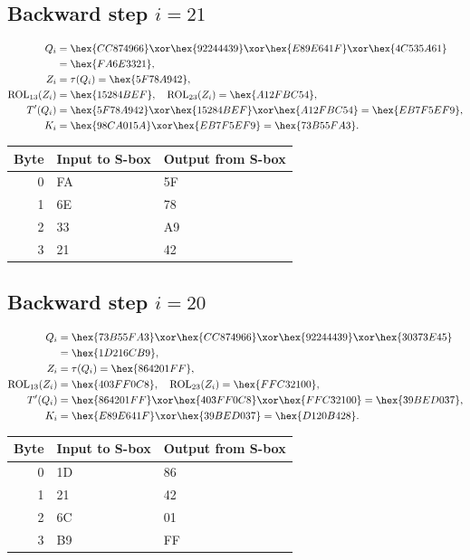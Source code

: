 \subsection*{Backward step $i=21$}
\begin{align*}
Q_i&=\hex{CC874966}\xor\hex{92244439}\xor\hex{E89E641F}\xor\hex{4C535A61}\\&=\hex{FA6E3321},\\
Z_i&=\tau(Q_i)=\hex{5F78A942},\\
\operatorname{ROL}_{13}(Z_i)&=\hex{15284BEF},\quad\operatorname{ROL}_{23}(Z_i)=\hex{A12FBC54},\\
T'(Q_i)&=\hex{5F78A942}\xor\hex{15284BEF}\xor\hex{A12FBC54}=\hex{EB7F5EF9},\\
K_i&=\hex{98CA015A}\xor\hex{EB7F5EF9}=\hex{73B55FA3}.\end{align*}
\begingroup\small
\begin{longtable}{rll}
\toprule
Byte & Input to S-box & Output from S-box\\\midrule
\endhead
0 & FA & 5F\\
1 & 6E & 78\\
2 & 33 & A9\\
3 & 21 & 42\\
\bottomrule\end{longtable}
\endgroup
\subsection*{Backward step $i=20$}
\begin{align*}
Q_i&=\hex{73B55FA3}\xor\hex{CC874966}\xor\hex{92244439}\xor\hex{30373E45}\\&=\hex{1D216CB9},\\
Z_i&=\tau(Q_i)=\hex{864201FF},\\
\operatorname{ROL}_{13}(Z_i)&=\hex{403FF0C8},\quad\operatorname{ROL}_{23}(Z_i)=\hex{FFC32100},\\
T'(Q_i)&=\hex{864201FF}\xor\hex{403FF0C8}\xor\hex{FFC32100}=\hex{39BED037},\\
K_i&=\hex{E89E641F}\xor\hex{39BED037}=\hex{D120B428}.\end{align*}
\begingroup\small
\begin{longtable}{rll}
\toprule
Byte & Input to S-box & Output from S-box\\\midrule
\endhead
0 & 1D & 86\\
1 & 21 & 42\\
2 & 6C & 01\\
3 & B9 & FF\\
\bottomrule\end{longtable}
\endgroup
